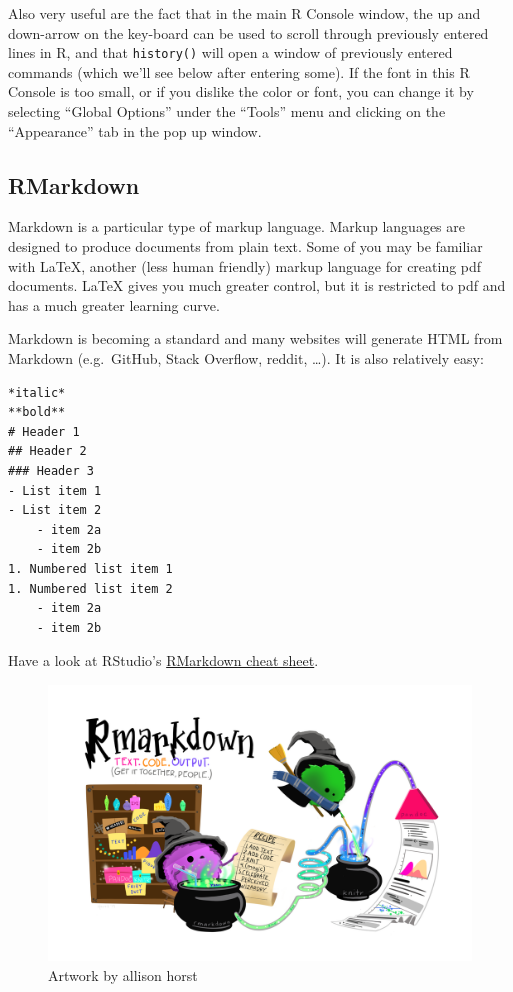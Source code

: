 \documentclass[
]{book}
\begin{document}
Also very useful are the fact that in the main R Console window, the up and down-arrow on the key-board can be used to scroll through previously entered lines in R, and that \texttt{history()} will open a window of previously entered commands (which we'll see below after entering some). If the font in this R Console is too small, or if you dislike the color or font, you can change it by selecting ``Global Options'' under the ``Tools'' menu and clicking on the ``Appearance'' tab in the pop up window.

\hypertarget{rmarkdown}{%
\subsection*{RMarkdown}\label{rmarkdown}}

Markdown is a particular type of markup language. Markup languages are designed to produce documents from plain text. Some of you may be familiar with LaTeX, another (less human friendly) markup language for creating pdf documents. LaTeX gives you much greater control, but it is restricted to pdf and has a much greater learning curve.

Markdown is becoming a standard and many websites will generate HTML from Markdown (e.g.~GitHub, Stack Overflow, reddit, \ldots). It is also relatively easy:

\begin{verbatim}
*italic*
**bold**
# Header 1
## Header 2
### Header 3
- List item 1
- List item 2
    - item 2a
    - item 2b
1. Numbered list item 1
1. Numbered list item 2
    - item 2a
    - item 2b
\end{verbatim}

Have a look at RStudio's \href{https://www.rstudio.com/resources/cheatsheets/}{RMarkdown cheat sheet}.

\begin{figure}
\includegraphics[width=55.24in]{img/rmarkdown_wizards} \caption{Artwork by allison horst}\label{fig:unnamed-chunk-1}
\end{figure}
\end{document}
